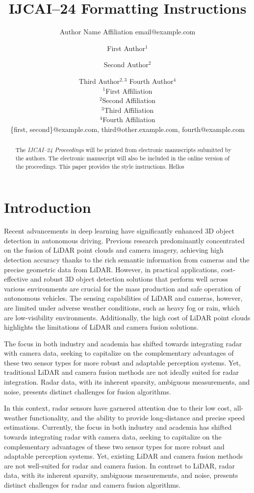 \documentclass{article}
\title{IJCAI--24 Formatting Instructions}
\author{
    Author Name
    \affiliations
    Affiliation
    \emails
    email@example.com
}
\author{
First Author$^1$
\and
Second Author$^2$\and
Third Author$^{2,3}$\And
Fourth Author$^4$\\
\affiliations
$^1$First Affiliation\\
$^2$Second Affiliation\\
$^3$Third Affiliation\\
$^4$Fourth Affiliation\\
\emails
\{first, second\}@example.com,
third@other.example.com,
fourth@example.com
}
\begin{document}
\maketitle

\begin{abstract}
    The {\it IJCAI--24 Proceedings} will be printed from electronic
    manuscripts submitted by the authors. The electronic manuscript will
    also be included in the online version of the proceedings. This paper
    provides the style instructions. Hellos
\end{abstract}

\section{Introduction}

Recent advancements in deep learning have significantly enhanced 3D object detection in autonomous driving. Previous research predominantly concentrated on the fusion of LiDAR point clouds and camera imagery, achieving high detection accuracy thanks to the rich semantic information from cameras and the precise geometric data from LiDAR. However, in practical applications, cost-effective and robust 3D object detection solutions that perform well across various environments are crucial for the mass production and safe operation of autonomous vehicles. The sensing capabilities of LiDAR and cameras, however, are limited under adverse weather conditions, such as heavy fog or rain, which are low-visibility environments. Additionally, the high cost of LiDAR point clouds highlights the limitations of LiDAR and camera fusion solutions.

The focus in both industry and academia has shifted towards integrating radar with camera data, seeking to capitalize on the complementary advantages of these two sensor types for more robust and adaptable perception systems. Yet, traditional LiDAR and camera fusion methods are not ideally suited for radar integration. Radar data, with its inherent sparsity, ambiguous measurements, and noise, presents distinct challenges for fusion algorithms.

In this context, radar sensors have garnered attention due to their low cost, all-weather functionality, and the ability to provide long-distance and precise speed estimations. Currently, the focus in both industry and academia has shifted towards integrating radar with camera data, seeking to capitalize on the complementary advantages of these two sensor types for more robust and adaptable perception systems. Yet, existing LiDAR and camera fusion methods are not well-suited for radar and camera fusion. In contrast to LiDAR, radar data, with its inherent sparsity, ambiguous measurements, and noise, presents distinct challenges for radar and camera fusion algorithms.
\end{document}
